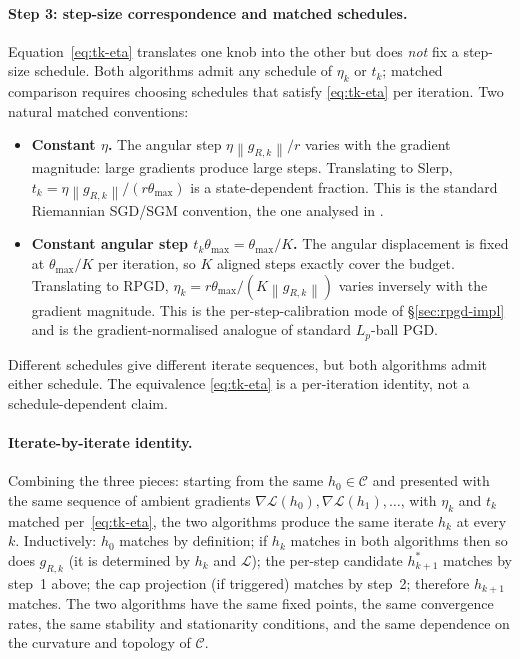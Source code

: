 \documentclass[11pt]{article}
\newcommand{\thmax}{\theta_{\max}}
\newcommand{\norm}[1]{\left\lVert#1\right\rVert}
\begin{document}
\paragraph{Step 3: step-size correspondence and matched schedules.} Equation~\eqref{eq:tk-eta} translates one knob into the other but does \emph{not} fix a step-size schedule. Both algorithms admit any schedule of $\eta_k$ or $t_k$; matched comparison requires choosing schedules that satisfy \eqref{eq:tk-eta} per iteration. Two natural matched conventions:
\begin{itemize}[leftmargin=*]
\item \textbf{Constant $\eta$.} The angular step $\eta\norm{g_{R,k}}/r$ varies with the gradient magnitude: large gradients produce large steps. Translating to Slerp, $t_k = \eta\norm{g_{R,k}}/(r\thmax)$ is a state-dependent fraction. This is the standard Riemannian SGD/SGM convention, the one analysed in \citet{bonnabel2013stochastic, tripuraneni2018averaging}.
\item \textbf{Constant angular step $t_k\thmax = \thmax/K$.} The angular displacement is fixed at $\thmax/K$ per iteration, so $K$ aligned steps exactly cover the budget. Translating to RPGD, $\eta_k = r\thmax/(K\norm{g_{R,k}})$ varies inversely with the gradient magnitude. This is the per-step-calibration mode of \S\ref{sec:rpgd-impl} and is the gradient-normalised analogue of standard $L_p$-ball PGD.
\end{itemize}
Different schedules give different iterate sequences, but both algorithms admit either schedule. The equivalence \eqref{eq:tk-eta} is a per-iteration identity, not a schedule-dependent claim.

\paragraph{Iterate-by-iterate identity.} Combining the three pieces: starting from the same $h_0 \in \mathcal{C}$ and presented with the same sequence of ambient gradients $\nabla\mathcal{L}(h_0), \nabla\mathcal{L}(h_1), \dots$, with $\eta_k$ and $t_k$ matched per~\eqref{eq:tk-eta}, the two algorithms produce the same iterate $h_k$ at every $k$. Inductively: $h_0$ matches by definition; if $h_k$ matches in both algorithms then so does $g_{R,k}$ (it is determined by $h_k$ and $\mathcal{L}$); the per-step candidate $h_{k+1}^*$ matches by step~1 above; the cap projection (if triggered) matches by step~2; therefore $h_{k+1}$ matches. The two algorithms have the same fixed points, the same convergence rates, the same stability and stationarity conditions, and the same dependence on the curvature and topology of $\mathcal{C}$.
\end{document}
